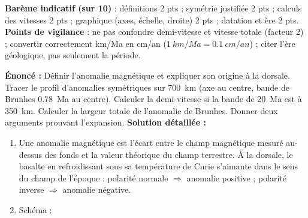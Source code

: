 \documentclass[11pt]{article}
\newcommand{\cle}[1]{{\popxbold\color{popdark}#1}}
\begin{document}
\begin{corrige}
\begin{enumerate}
\end{enumerate}
\textbf{Barème indicatif (sur 10)} : définitions 2 pts ; symétrie justifiée 2 pts ; calculs des vitesses 2 pts ; graphique (axes, échelle, droite) 2 pts ; datation et ère 2 pts.
\textbf{Points de vigilance} : ne pas confondre demi-vitesse et vitesse totale (facteur 2) ; convertir correctement km/Ma en cm/an ($\SI{1}{km/Ma} = \SI{0,1}{cm/an}$) ; citer l'ère géologique, pas seulement la période.
\end{corrige}

\begin{corrige}
\textbf{Énoncé :} Définir l'anomalie magnétique et expliquer son origine à la dorsale. Tracer le profil d'anomalies symétriques sur \SI{700}{km} (axe au centre, bande de Brunhes \SI{0,78}{Ma} au centre). Calculer la demi-vitesse si la bande de \SI{20}{Ma} est à \SI{350}{km}. Calculer la largeur totale de l'anomalie de Brunhes. Donner deux arguments prouvant l'expansion.
\tcblower
\textbf{Solution détaillée :}
\begin{enumerate}
\item Une \cle{anomalie magnétique} est l'écart entre le champ magnétique mesuré au-dessus des fonds et la valeur théorique du champ terrestre. À la dorsale, le basalte en refroidissant sous sa température de Curie s'aimante dans le sens du champ de l'époque : polarité normale $\Rightarrow$ anomalie positive ; polarité inverse $\Rightarrow$ anomalie négative.
\item Schéma :
\begin{popfigure}
\begin{center}
\end{center}
\end{popfigure}
\end{enumerate}
\end{corrige}
\end{document}

